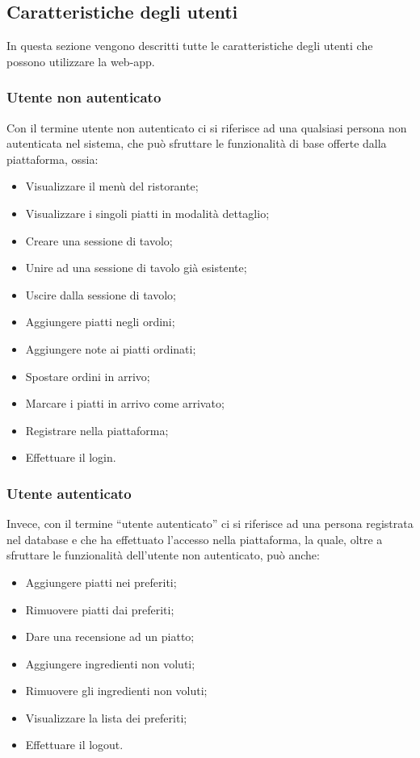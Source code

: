 \subsection{Caratteristiche degli utenti}
In questa sezione vengono descritti tutte le caratteristiche degli utenti che possono utilizzare la web-app.
\subsubsection{Utente non autenticato}
Con il termine utente non autenticato ci si riferisce ad una qualsiasi persona non autenticata nel sistema, che può sfruttare le funzionalità di base offerte dalla piattaforma, ossia:
\begin{itemize}
    \item Visualizzare il menù del ristorante;
    \item Visualizzare i singoli piatti in modalità dettaglio;
    \item Creare una sessione di tavolo;
    \item Unire ad una sessione di tavolo già esistente;
    \item Uscire dalla sessione di tavolo;
    \item Aggiungere piatti negli ordini;
    \item Aggiungere note ai piatti ordinati;
    \item Spostare ordini in arrivo;
    \item Marcare i piatti in arrivo come arrivato;
    \item Registrare nella piattaforma;
    \item Effettuare il login.
\end{itemize}
\subsubsection{Utente autenticato}
Invece, con il termine “utente autenticato” ci si riferisce ad una persona registrata nel database e che ha effettuato l'accesso nella piattaforma, la quale, oltre a sfruttare le funzionalità dell'utente non autenticato, può anche:
\begin{itemize}
    \item Aggiungere piatti nei preferiti;
    \item Rimuovere piatti dai preferiti;
    \item Dare una recensione ad un piatto;
    \item Aggiungere ingredienti non voluti;
    \item Rimuovere gli ingredienti non voluti;
    \item Visualizzare la lista dei preferiti;
    \item Effettuare il logout.
\end{itemize}

